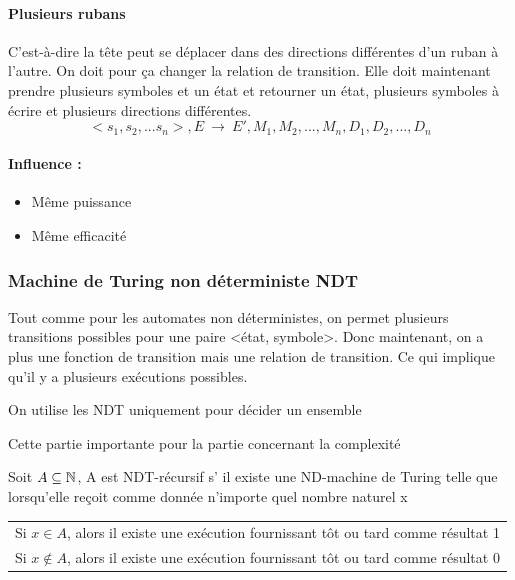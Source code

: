 \paragraph{Plusieurs rubans}C'est-à-dire la tête peut se déplacer dans des directions 
différentes d'un ruban à l'autre. On doit pour ça changer la relation de 
transition. Elle doit maintenant prendre plusieurs symboles et un état et 
retourner un état, plusieurs symboles à écrire et plusieurs directions différentes.
$$<s_1,s_2,...s_n>, E \  \rightarrow \ E', M_1, M_2,..., M_n, D_1, D_2,..., 
D_n$$
\paragraph{Influence :} 
\begin{itemize}
	\item Même puissance
	\item Même efficacité
\end{itemize}

\subsubsection{Machine de Turing non déterministe NDT}
Tout comme pour les automates non déterministes, on permet plusieurs 
transitions possibles pour une paire <état, symbole>. Donc maintenant, on a
plus une fonction de transition mais une relation de transition. Ce qui
implique qu'il y a plusieurs exécutions possibles.

\begin{myrem}
	On utilise les NDT uniquement pour décider un ensemble
\end{myrem}

\begin{myrem}
	Cette partie importante pour la partie concernant la complexité
\end{myrem}

\begin{mydef} Soit $A\subseteq \mathbb{N}$, A est NDT-récursif s’ il 
	existe une ND-machine de Turing telle que lorsqu'elle reçoit comme 
	donnée n'importe quel nombre naturel x\\
	\begin{tabular}{l}
		Si $x\in A$, alors il existe une exécution fournissant tôt ou 
		tard comme résultat 1\\
		Si $x\notin A$, alors il existe une exécution fournissant tôt ou 
		tard comme résultat 0\\
	\end{tabular}
\end{mydef}

